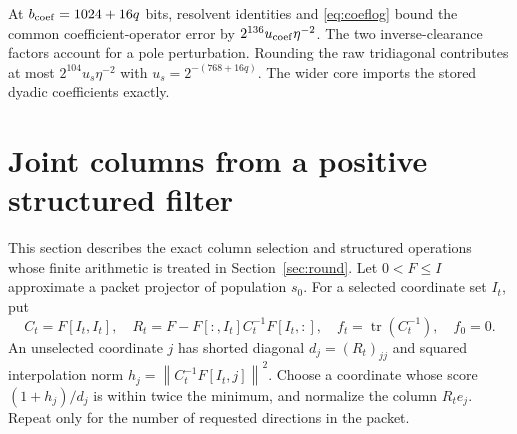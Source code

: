 \documentclass[11pt]{article}
\theoremstyle{remark}\newtheorem{remark}[theorem]{Remark}
\newcommand{\norm}[1]{\left\lVert#1\right\rVert}
\newcommand{\tr}{\operatorname{tr}}
\begin{document}
At $b_{\rm coef}=1024+16q$ bits, resolvent identities and
\eqref{eq:coeflog} bound the common coefficient-operator error by
$2^{136}u_{\rm coef}\eta^{-2}$. The two inverse-clearance factors account
for a pole perturbation. Rounding the raw tridiagonal contributes at most
$2^{104}u_s\eta^{-2}$ with $u_s=2^{-(768+16q)}$.
The wider core imports the stored dyadic coefficients exactly.

\section{Joint columns from a positive structured filter}\label{sec:columns}
This section describes the exact column selection and structured operations
whose finite arithmetic is treated in Section~\ref{sec:round}.
Let $0<F\le I$ approximate a packet projector of population $s_0$.
For a selected coordinate set $I_t$, put
\[
 C_t=F[I_t,I_t],\quad
 R_t=F-F[:,I_t]C_t^{-1}F[I_t,:],\quad f_t=\tr(C_t^{-1}),\quad f_0=0.
\]
An unselected coordinate $j$ has shorted diagonal $d_j=(R_t)_{jj}$ and
squared interpolation norm $h_j=\norm{C_t^{-1}F[I_t,j]}^2$.
Choose a coordinate whose score $(1+h_j)/d_j$ is within twice the minimum,
and normalize the column $R_te_j$. Repeat only for the number of requested
directions in the packet.
\end{document}
